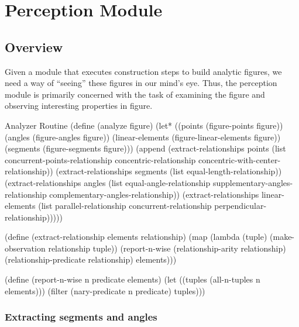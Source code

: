 \chapter{Perception Module}
\label{chap:observer}

\section{Overview}

Given a module that executes construction steps to build analytic
figures, we need a way of ``seeing'' these figures in our mind's eye.
Thus, the perception module is primarily concerned with the task of
examining the figure and observing interesting properties in figure.

\begin{code-listing}{Analyzer Routine}
(define (analyze figure)
  (let* ((points (figure-points figure))
         (angles (figure-angles figure))
         (linear-elements (figure-linear-elements figure))
         (segments (figure-segments figure)))
    (append
     (extract-relationships points
                            (list concurrent-points-relationship
                                  concentric-relationship
                                  concentric-with-center-relationship))
     (extract-relationships segments
                             (list equal-length-relationship))
     (extract-relationships angles
                             (list equal-angle-relationship
                                   supplementary-angles-relationship
                                   complementary-angles-relationship))
     (extract-relationships linear-elements
                             (list parallel-relationship
                                   concurrent-relationship
                                   perpendicular-relationship)))))
\end{code-listing}

\begin{code-listing}
(define (extract-relationship elements relationship)
  (map (lambda (tuple)
         (make-observation relationship tuple))
       (report-n-wise
        (relationship-arity relationship)
        (relationship-predicate relationship)
        elements)))

(define (report-n-wise n predicate elements)
  (let ((tuples (all-n-tuples n elements)))
    (filter (nary-predicate n predicate) tuples)))
\end{code-listing}

\subsection{Extracting segments and angles}

